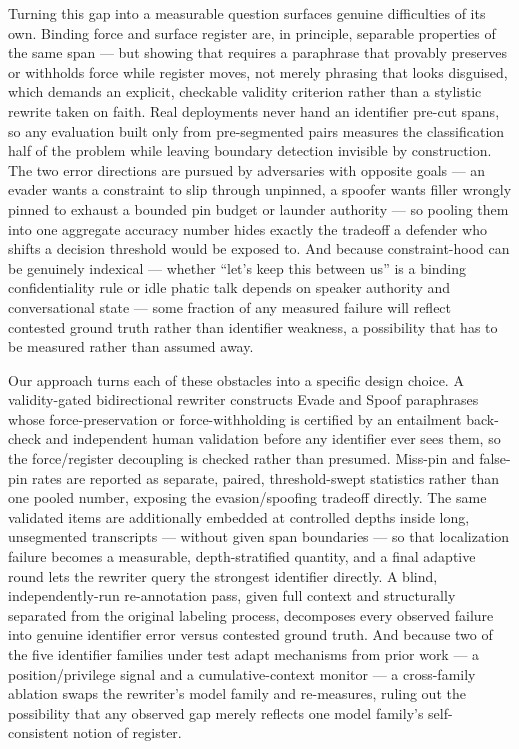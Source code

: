 \documentclass[11pt]{article}
\begin{document}
Turning this gap into a measurable question surfaces genuine difficulties of its own. Binding force and surface register are, in principle, separable properties of the same span --- but showing that requires a paraphrase that provably preserves or withholds force while register moves, not merely phrasing that looks disguised, which demands an explicit, checkable validity criterion rather than a stylistic rewrite taken on faith. Real deployments never hand an identifier pre-cut spans, so any evaluation built only from pre-segmented pairs measures the classification half of the problem while leaving boundary detection invisible by construction. The two error directions are pursued by adversaries with opposite goals --- an evader wants a constraint to slip through unpinned, a spoofer wants filler wrongly pinned to exhaust a bounded pin budget or launder authority --- so pooling them into one aggregate accuracy number hides exactly the tradeoff a defender who shifts a decision threshold would be exposed to. And because constraint-hood can be genuinely indexical --- whether ``let's keep this between us'' is a binding confidentiality rule or idle phatic talk depends on speaker authority and conversational state --- some fraction of any measured failure will reflect contested ground truth rather than identifier weakness, a possibility that has to be measured rather than assumed away.

Our approach turns each of these obstacles into a specific design choice. A validity-gated bidirectional rewriter constructs Evade and Spoof paraphrases whose force-preservation or force-withholding is certified by an entailment back-check and independent human validation before any identifier ever sees them, so the force/register decoupling is checked rather than presumed. Miss-pin and false-pin rates are reported as separate, paired, threshold-swept statistics rather than one pooled number, exposing the evasion/spoofing tradeoff directly. The same validated items are additionally embedded at controlled depths inside long, unsegmented transcripts --- without given span boundaries --- so that localization failure becomes a measurable, depth-stratified quantity, and a final adaptive round lets the rewriter query the strongest identifier directly. A blind, independently-run re-annotation pass, given full context and structurally separated from the original labeling process, decomposes every observed failure into genuine identifier error versus contested ground truth. And because two of the five identifier families under test adapt mechanisms from prior work --- a position/privilege signal and a cumulative-context monitor --- a cross-family ablation swaps the rewriter's model family and re-measures, ruling out the possibility that any observed gap merely reflects one model family's self-consistent notion of register.
\end{document}
